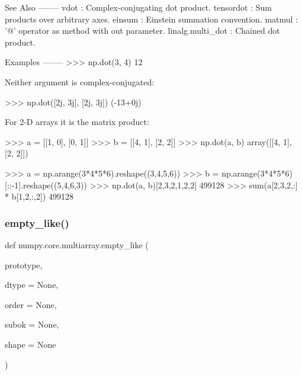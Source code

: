 \begin{DoxyVerb}
See Also
--------
vdot : Complex-conjugating dot product.
tensordot : Sum products over arbitrary axes.
einsum : Einstein summation convention.
matmul : '@' operator as method with out parameter.
linalg.multi_dot : Chained dot product.

Examples
--------
>>> np.dot(3, 4)
12

Neither argument is complex-conjugated:

>>> np.dot([2j, 3j], [2j, 3j])
(-13+0j)

For 2-D arrays it is the matrix product:

>>> a = [[1, 0], [0, 1]]
>>> b = [[4, 1], [2, 2]]
>>> np.dot(a, b)
array([[4, 1],
       [2, 2]])

>>> a = np.arange(3*4*5*6).reshape((3,4,5,6))
>>> b = np.arange(3*4*5*6)[::-1].reshape((5,4,6,3))
>>> np.dot(a, b)[2,3,2,1,2,2]
499128
>>> sum(a[2,3,2,:] * b[1,2,:,2])
499128\end{DoxyVerb}
 \mbox{\label{namespacenumpy_1_1core_1_1multiarray_aa079a8a2542e7960d6f2b334ada7e93e}} 
\subsubsection{\texorpdfstring{empty\+\_\+like()}{empty\_like()}}
{\footnotesize\ttfamily def numpy.\+core.\+multiarray.\+empty\+\_\+like (\begin{DoxyParamCaption}\item[{}]{prototype,  }\item[{}]{dtype = {\ttfamily None},  }\item[{}]{order = {\ttfamily None},  }\item[{}]{subok = {\ttfamily None},  }\item[{}]{shape = {\ttfamily None} }\end{DoxyParamCaption})}

